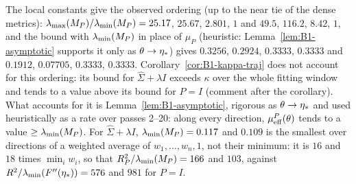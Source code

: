 The local constants give the observed ordering (up to the near tie of the dense metrics):
$\lambda_{\max}(M_P)/\lambda_{\min}(M_P)=25.17$, $25.67$, $2.801$, $1$ and $49.5$, $116.2$, $8.42$, $1$, and the bound with
$\lambda_{\min}(M_P)$ in place of $\mu_P$ (heuristic: Lemma~\ref{lem:B1-asymptotic} supports it only as
$\theta\to\eta_\ast$) gives $0.3256$, $0.2924$, $0.3333$, $0.3333$ and $0.1912$, $0.07705$, $0.3333$, $0.3333$.
Corollary~\ref{cor:B1-kappa-traj} does not account for this ordering: its bound for $\hat\Sigma+\lambda I$
exceeds $\kappa$ over the whole fitting window and tends to a value above its bound for $P=I$ (comment after
the corollary). What
accounts for it is Lemma~\ref{lem:B1-asymptotic}, rigorous as $\theta\to\eta_\ast$ and used heuristically as a
rate over passes 2--20: along every direction, $\mu_{\mathrm{eff}}^P(\theta)$ tends to a value $\ge\lambda_{\min}(M_P)$. For
$\hat\Sigma+\lambda I$, $\lambda_{\min}(M_P)=0.117$ and $0.109$ is the smallest over directions of a weighted average of
$w_1,\dots,w_n,1$, not their minimum: it is $16$ and $18$ times $\min_iw_i$, so that $R_P^2/\lambda_{\min}(M_P)=166$ and
$103$, against $R^2/\lambda_{\min}(F''(\eta_\ast))=576$ and $981$ for $P=I$.


